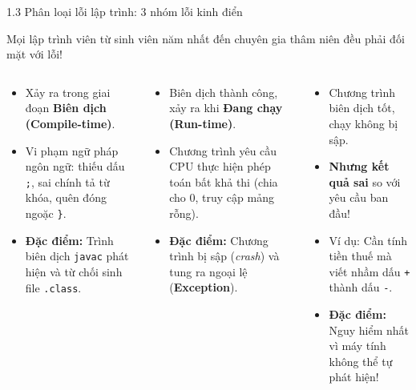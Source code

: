 \documentclass[aspectratio=169, 10pt]{beamer}
\begin{document}
\begin{frame}{1.3 Phân loại lỗi lập trình: 3 nhóm lỗi kinh điển}
  \begin{center}
    Mọi lập trình viên từ sinh viên năm nhất đến chuyên gia thâm niên đều phải đối mặt với lỗi!
  \end{center}
  \vspace{1mm}
  \begin{columns}[t]
    \begin{tcolorbox}[colback=red!10,colframe=red!80!black,title=\textbf{1. Lỗi Cú pháp\\(Syntax Errors)},fonttitle=\small\bfseries]
      \footnotesize
      \begin{itemize}
        \item Xảy ra trong giai đoạn \textbf{Biên dịch (Compile-time)}.
        \item Vi phạm ngữ pháp ngôn ngữ: thiếu dấu \texttt{;}, sai chính tả từ khóa, quên đóng ngoặc \texttt{\}}.
        \item \textbf{Đặc điểm:} Trình biên dịch \texttt{javac} phát hiện và từ chối sinh file \texttt{.class}.
      \end{itemize}
    \end{tcolorbox}

    \begin{tcolorbox}[colback=orange!10,colframe=orange!90!black,title=\textbf{2. Lỗi Thực thi\\(Runtime Errors)},fonttitle=\small\bfseries]
      \footnotesize
      \begin{itemize}
        \item Biên dịch thành công, xảy ra khi \textbf{Đang chạy (Run-time)}.
        \item Chương trình yêu cầu CPU thực hiện phép toán bất khả thi (chia cho 0, truy cập mảng rỗng).
        \item \textbf{Đặc điểm:} Chương trình bị sập (\textit{crash}) và tung ra ngoại lệ (\textbf{Exception}).
      \end{itemize}
    \end{tcolorbox}

    \begin{tcolorbox}[colback=blue!10,colframe=blue!80!black,title=\textbf{3. Lỗi Ngữ nghĩa\\(Logic / Intent Errors)},fonttitle=\small\bfseries]
      \footnotesize
      \begin{itemize}
        \item Chương trình biên dịch tốt, chạy không bị sập.
        \item \textbf{Nhưng kết quả sai} so với yêu cầu ban đầu!
        \item Ví dụ: Cần tính tiền thuế mà viết nhầm dấu \texttt{+} thành dấu \texttt{-}.
        \item \textbf{Đặc điểm:} Nguy hiểm nhất vì máy tính không thể tự phát hiện!
      \end{itemize}
    \end{tcolorbox}
  \end{columns}
\end{frame}
\end{document}
